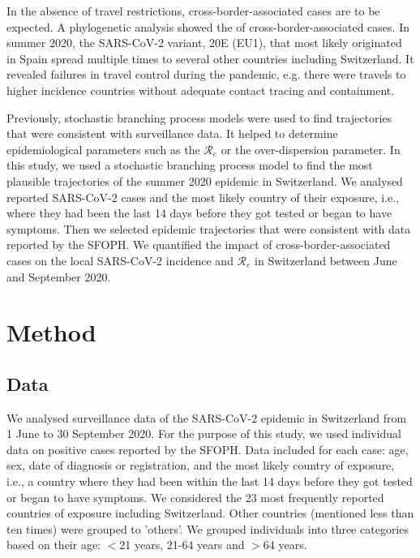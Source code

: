 \documentclass[10pt, a4paper, twoside]{article}
\begin{document}
\begin{multicols}{2}
In the absence of travel restrictions, cross-border-associated cases are to be expected.\cite{russell_effect_2021} 
A phylogenetic analysis showed the  of cross-border-associated cases.\cite{hodcroft_emergence_2020}
In summer 2020, the SARS-CoV-2 variant, 20E (EU1), that most likely originated in Spain spread multiple times to several other countries including Switzerland.\cite{hodcroft_emergence_2020}
It revealed failures in travel control during the pandemic, e.g. there were travels to higher incidence countries without adequate contact tracing and containment.\cite{hodcroft_emergence_2020}

Previously, stochastic branching process models were used to find trajectories that were consistent with surveillance data.\cite{althaus_ebola_2015,riou_pattern_2020}
It helped to determine epidemiological parameters such as the $\mathcal{R}_e$ or the over-dispersion parameter.\cite{althaus_ebola_2015,riou_pattern_2020}
In this study, we used a stochastic branching process model to find the most plausible trajectories of the summer 2020 epidemic in Switzerland.
We analysed reported SARS-CoV-2 cases and the most likely country of their exposure, i.e., where they had been the last 14 days before they got tested or began to have symptoms.
Then we selected epidemic trajectories that were consistent with data reported by the SFOPH.
We quantified the impact of cross-border-associated cases on the local SARS-CoV-2 incidence and $\mathcal{R}_e$ in Switzerland between June and September 2020.

\section{Method}

\subsection{Data}
We analysed surveillance data of the SARS-CoV-2 epidemic in Switzerland from 1 June to 30 September 2020. 
For the purpose of this study, we used individual data on positive cases reported by the SFOPH. 
Data included for each case: age, sex, date of diagnosis or registration, and the most likely country of exposure, i.e., a country where they had been within the last 14 days before they got tested or began to have symptoms.
We considered the 23 most frequently reported countries of exposure including Switzerland.
Other countries (mentioned less than ten times) were grouped to 'others'.
We grouped individuals into three categories based on their age: $<$21 years, 21-64 years and  $>$64 years.


\end{multicols}
\end{document}
